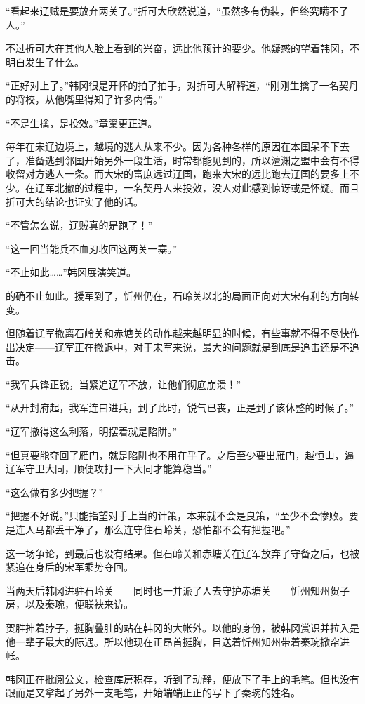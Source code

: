 “看起来辽贼是要放弃两关了。”折可大欣然说道，“虽然多有伪装，但终究瞒不了人。”

不过折可大在其他人脸上看到的兴奋，远比他预计的要少。他疑惑的望着韩冈，不明白发生了什么。

“正好对上了。”韩冈很是开怀的拍了拍手，对折可大解释道，“刚刚生擒了一名契丹的将校，从他嘴里得知了许多内情。”

“不是生擒，是投效。”章楶更正道。

每年在宋辽边境上，越境的逃人从来不少。因为各种各样的原因在本国呆不下去了，准备逃到邻国开始另外一段生活，时常都能见到的，所以澶渊之盟中会有不得收留对方逃人一条。而大宋的富庶远过辽国，跑来大宋的远比跑去辽国的要多上不少。在辽军北撤的过程中，一名契丹人来投效，没人对此感到惊讶或是怀疑。而且折可大的结论也证实了他的话。

“不管怎么说，辽贼真的是跑了！”

“这一回当能兵不血刃收回这两关一寨。”

“不止如此……”韩冈展演笑道。

的确不止如此。援军到了，忻州仍在，石岭关以北的局面正向对大宋有利的方向转变。

但随着辽军撤离石岭关和赤塘关的动作越来越明显的时候，有些事就不得不尽快作出决定——辽军正在撤退中，对于宋军来说，最大的问题就是到底是追击还是不追击。

“我军兵锋正锐，当紧追辽军不放，让他们彻底崩溃！”

“从开封府起，我军连曰进兵，到了此时，锐气已丧，正是到了该休整的时候了。”

“辽军撤得这么利落，明摆着就是陷阱。”

“但真要能夺回了雁门，就是陷阱也不用在乎了。之后至少要出雁门，越恒山，逼辽军守卫大同，顺便攻打一下大同才能算稳当。”

“这么做有多少把握？”

“把握不好说。”只能指望对手上当的计策，本来就不会是良策，“至少不会惨败。要是连人马都丢干净了，那么连守住石岭关，恐怕都不会有把握吧。”

这一场争论，到最后也没有结果。但石岭关和赤塘关在辽军放弃了守备之后，也被紧追在身后的宋军乘势夺回。

当两天后韩冈进驻石岭关——同时也一并派了人去守护赤塘关——忻州知州贺子房，以及秦琬，便联袂来访。

贺胜抻着脖子，挺胸叠肚的站在韩冈的大帐外。以他的身份，被韩冈赏识并拉入是他一辈子最大的际遇。所以他现在正昂首挺胸，目送着忻州知州带着秦琬掀帘进帐。

韩冈正在批阅公文，检查库房积存，听到了动静，便放下了手上的毛笔。但也没有跟而是又拿起了另外一支毛笔，开始端端正正的写下了秦琬的姓名。


